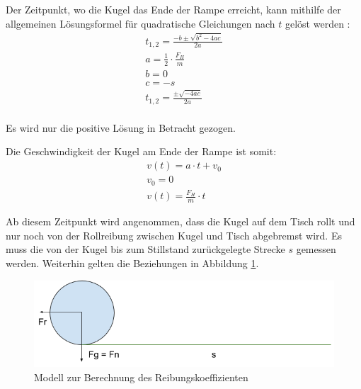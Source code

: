 Der Zeitpunkt, wo die Kugel das Ende der Rampe erreicht, kann mithilfe der allgemeinen Lösungsformel für quadratische Gleichungen nach $t$ gelöst werden \cite{wiki.mitternachtsformel:1}:
\begin{align}
    t_{1,2} = \frac{-b \pm \sqrt{b^2 - 4ac}}{2a}\\
    a = \frac{1}{2} \cdot \frac{F_H}{m}\\
    b = 0\\
    c = -s\\
    t_{1,2} = \frac{\pm \sqrt{-4ac}}{2a}\\
\end{align}

Es wird nur die positive Lösung in Betracht gezogen.

Die Geschwindigkeit der Kugel am Ende der Rampe ist somit:
\begin{align}
    v(t) = a \cdot t + v_0\\
    v_0 = 0\\
    v(t) = \frac{F_H}{m} \cdot t
\end{align}

Ab diesem Zeitpunkt wird angenommen, dass die Kugel auf dem Tisch rollt und nur noch von der Rollreibung zwischen Kugel und Tisch abgebremst wird.
Es muss die von der Kugel bis zum Stillstand zurückgelegte Strecke $s$ gemessen werden.
Weiterhin gelten die Beziehungen in Abbildung \ref{fig:modell_reibungskoeffizient}.

\begin{figure}[h!]
    \begin{center}
        \includegraphics[width=0.5\linewidth]{../common/07_appendix/resources/01_reibungskoeffizient_tisch.png}
    \end{center}
    \caption{Modell zur Berechnung des Reibungskoeffizienten}
    \label{fig:modell_reibungskoeffizient}
\end{figure}

